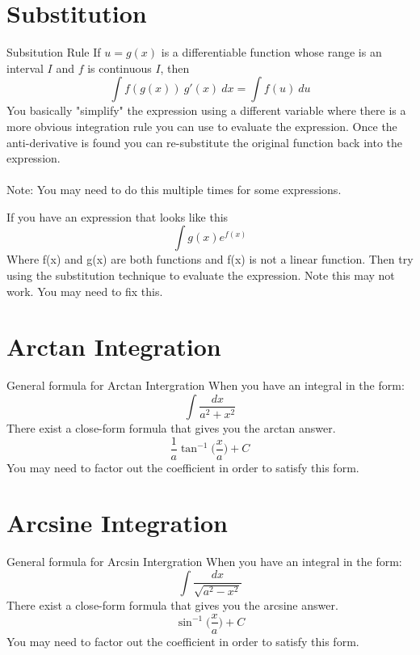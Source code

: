 \documentclass[letterpaper,10pt,twoside,twocolumn,openany]{book}
\begin{document}
\section{Substitution}
\begin{DndSidebar}{Subsitution Rule}
    If $u = g(x)$ is a differentiable function whose range is an interval $I$ and $f$ is continuous $I$, then
    \begin{equation}
        \int f(g(x))\ g'(x)\ dx = \int f(u)\ du
    \end{equation}
    You basically "simplify" the expression using a different variable where there is a more obvious integration rule you can use to evaluate the expression. Once the anti-derivative is found you can re-substitute the original function back into the expression.
    \\~\\
    Note: You may need to do this multiple times for some expressions.  
\end{DndSidebar}
\newpage
If you have an expression that looks like this 
$$
    \int g(x)e^{f(x)}
$$
Where f(x) and g(x) are both functions and f(x) is not a linear function. Then try using the substitution technique to evaluate the expression. Note this may not work. You may need to fix this.

\section{Arctan Integration}
\begin{DndSidebar}[]{General formula for Arctan Intergration}
    When you have an integral in the form:
    \begin{equation*}
        \int \frac{dx}{a^2 + x^2}
    \end{equation*}
    There exist a close-form formula that gives you the arctan answer.\\
    \begin{equation}
        \frac{1}{a} \tan^{-1}  \Big(\frac{x}{a}\Big) + C
    \end{equation}
    You may need to factor out the coefficient in order to satisfy this form.
\end{DndSidebar}




\section{Arcsine Integration}
\begin{DndSidebar}[]{General formula for Arcsin Intergration}
    When you have an integral in the form:
    \begin{equation*}
        \int \frac{dx}{\sqrt{a^2 - x^2}}
    \end{equation*}
    There exist a close-form formula that gives you the arcsine answer.\\
    \begin{equation}
        \sin^{-1}  \Big(\frac{x}{a}\Big) + C
    \end{equation}
    You may need to factor out the coefficient in order to satisfy this form.
\end{DndSidebar}
    
\end{document}
